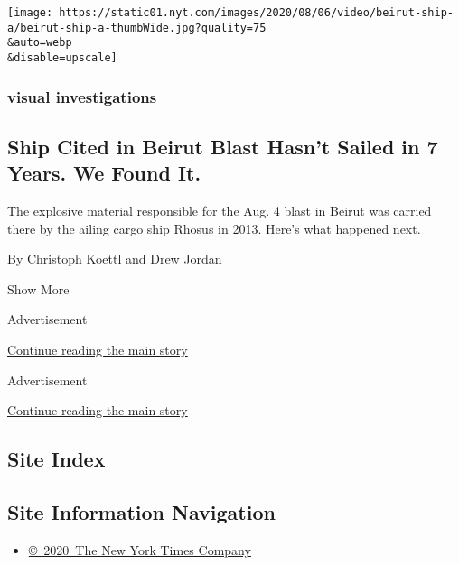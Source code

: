 \begin{enumerate}
  \texttt{[image: https://static01.nyt.com/images/2020/08/06/video/beirut-ship-a/beirut-ship-a-thumbWide.jpg?quality=75\\\&auto=webp\\\&disable=upscale]}

  \hypertarget{visual-investigations}{%
  \subsubsection{visual investigations}\label{visual-investigations}}

  \hypertarget{ship-cited-in-beirut-blast-hasnt-sailed-in-7-years-we-found-it}{%
  \subsection{Ship Cited in Beirut Blast Hasn't Sailed in 7 Years. We
  Found
  It.}\label{ship-cited-in-beirut-blast-hasnt-sailed-in-7-years-we-found-it}}

  The explosive material responsible for the Aug. 4 blast in Beirut was
  carried there by the ailing cargo ship Rhosus in 2013. Here's what
  happened next.

  By Christoph Koettl and Drew Jordan
\end{enumerate}

Show More

Advertisement

\protect\hyperlink{after-mid4}{Continue reading the main story}

Advertisement

\protect\hyperlink{after-mktg}{Continue reading the main story}

\hypertarget{site-index}{%
\subsection{Site Index}\label{site-index}}

\hypertarget{site-information-navigation}{%
\subsection{Site Information
Navigation}\label{site-information-navigation}}

\begin{itemize}
\tightlist
\item
  \href{https://help.nytimes.com/hc/en-us/articles/115014792127-Copyright-notice}{©~2020~The
  New York Times Company}
\end{itemize}

